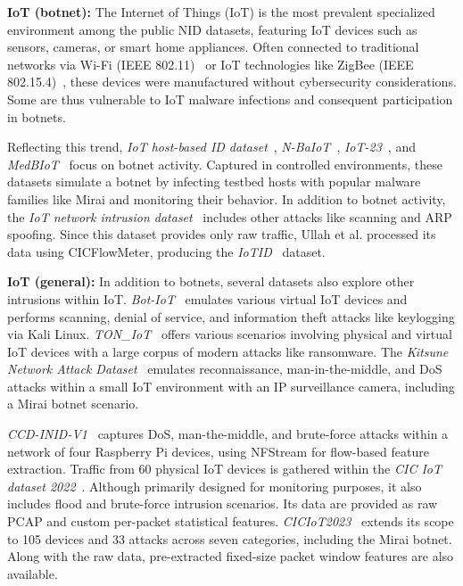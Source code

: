 \textbf{IoT (botnet):}
The Internet of Things (IoT) is the most prevalent specialized environment among the public NID datasets, featuring IoT devices such as sensors, cameras, or smart home appliances. Often connected to traditional networks via Wi-Fi (IEEE 802.11)~\cite{crow1997_ieee802_11} or IoT technologies like ZigBee (IEEE 802.15.4)~\cite{ieee_ieee802_15_4}, these devices were manufactured without cybersecurity considerations. Some are thus vulnerable to IoT malware infections and consequent participation in botnets.

Reflecting this trend, \emph{IoT host-based ID dataset}~\cite{bezerra2018_iot_hostbased_dataset}, \emph{N-BaIoT}~\cite{meidan2018_nbaiot_dataset}, \emph{IoT-23}~\cite{garcia2020_iot23_dataset}, and \emph{MedBIoT}~\cite{guerramanzanes2020_medbiot} focus on botnet activity. Captured in controlled environments, these datasets simulate a botnet by infecting testbed hosts with popular malware families like Mirai and monitoring their behavior. In addition to botnet activity, the \emph{IoT network intrusion dataset}~\cite{kang2019_iot_net_intrusion_dataset} includes other attacks like scanning and ARP spoofing. Since this dataset provides only raw traffic, Ullah et al. processed its data using CICFlowMeter, producing the \emph{IoTID}~\cite{ullah2020_iotid} dataset.

\textbf{IoT (general):}
In addition to botnets, several datasets also explore other intrusions within IoT. \emph{Bot-IoT}~\cite{koroniotis2019_botiot_dataset} emulates various virtual IoT devices and performs scanning, denial of service, and information theft attacks like keylogging via Kali Linux. \emph{TON\_IoT}~\cite{alsaedi2020_toniot_dataset, moustafa2021_toniot_net} offers various scenarios involving physical and virtual IoT devices with a large corpus of modern attacks like ransomware. The \emph{Kitsune Network Attack Dataset}~\cite{mirsky2018_kitsune} emulates reconnaissance, man-in-the-middle, and DoS attacks within a small IoT environment with an IP surveillance camera, including a Mirai botnet scenario.

\emph{CCD-INID-V1}~\cite{liu2021_ccd_inid_v1} captures DoS, man-the-middle, and brute-force attacks within a network of four Raspberry Pi devices, using NFStream for flow-based feature extraction. Traffic from 60 physical IoT devices is gathered within the \emph{CIC IoT dataset 2022}~\cite{dadkhah2022_ciciot2022}. Although primarily designed for monitoring purposes, it also includes flood and brute-force intrusion scenarios. Its data are provided as raw PCAP and custom per-packet statistical features. \emph{CICIoT2023}~\cite{neto2023_ciciot2023} extends its scope to 105 devices and 33 attacks across seven categories, including the Mirai botnet. Along with the raw data, pre-extracted fixed-size packet window features are also available.

